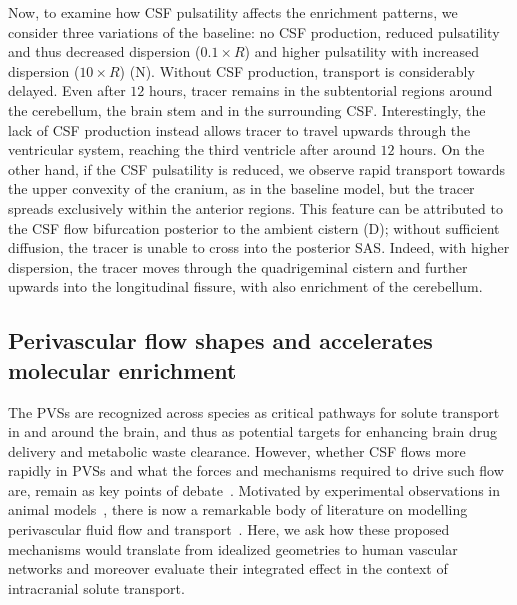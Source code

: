 \documentclass[fleqn,10pt]{wlscirep}
\newcommand{\mer}[1]{\textcolor{magenta}{#1}}
\begin{document}
Now, to examine how CSF pulsatility affects the enrichment patterns,
we consider three variations of the baseline: no CSF production,
reduced pulsatility and thus decreased dispersion ($0.1 \times R$) and
higher pulsatility with increased dispersion ($10 \times R$)
(N). Without CSF production, transport is considerably
delayed. Even after $12$ hours, tracer remains in the subtentorial
regions around the cerebellum, the brain stem and in the surrounding
CSF. Interestingly, the lack of CSF production instead allows tracer
to travel upwards through the ventricular system, reaching the third
ventricle after around $12$ hours. On the other hand, if the CSF
pulsatility is reduced, we observe rapid transport towards the upper
convexity of the cranium, as in the baseline model, but the tracer
spreads exclusively within the anterior regions. This feature can be
attributed to the CSF flow bifurcation posterior to the
  ambient cistern (D); without sufficient diffusion, the
  tracer is unable to cross into the posterior SAS. Indeed, with
higher dispersion, the tracer moves through the quadrigeminal cistern
and further upwards into the longitudinal fissure, with also
enrichment of the cerebellum.

\subsection*{Perivascular flow shapes and accelerates molecular enrichment}
\label{sec:pvs_flow_results}

The PVSs are recognized across species as critical pathways for solute
transport in and around the brain\cite{}, and thus as potential
targets for enhancing brain drug delivery and metabolic waste
clearance\cite{}. However, whether CSF flows more rapidly in PVSs and
what the forces and mechanisms required to drive such flow are, remain
as key points of debate~\cite{bohr2022glymphatic,
  van2024caa}. Motivated by experimental observations in animal
models~\cite{iliff2012paravascular, iliff2013cerebral, mestre2018flow,
  bedussi2018paravascular}, there is now a remarkable body of
literature on modelling perivascular fluid flow and
transport~\cite{bilston2003arterial, asgari2016glymphatic,
  rey2018pulsatile, daversin2020mechanisms, sharp2019dispersion,
  thomas2019fluid, kedarasetti2020functional, kedarasetti2020arterial,
  troyetsky2021dispersion, martinac2021phase, gjerde2023directional,
  nozaleda2024arterial}. Here, we ask how these proposed mechanisms
would translate from idealized geometries to human vascular networks
and moreover evaluate their integrated effect in the context of
intracranial solute transport.
\end{document}
